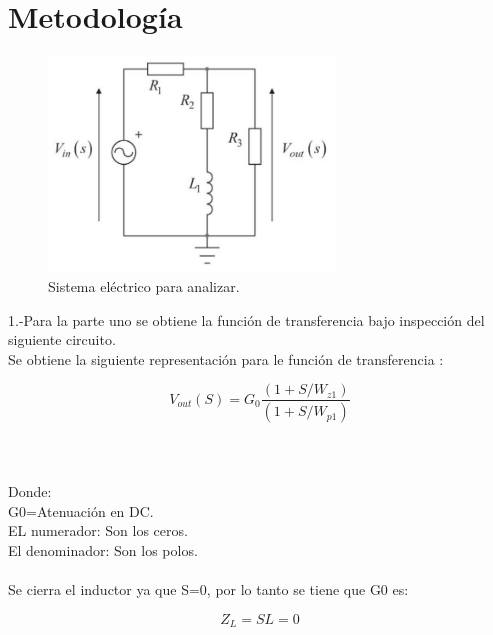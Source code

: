 \documentclass[12pt,letterpaper]{article}     %
\begin{document}
\section{Metodología}

\begin{figure}[h!]
\centering
\includegraphics[width=3in]{Circuito}
\caption{Sistema eléctrico para analizar.}

\end{figure}

1.-Para la parte uno se obtiene la función de transferencia bajo inspección del siguiente circuito.
\\
Se obtiene la siguiente representación para le función de transferencia :

\begin{equation}\label{eq:ej1}
V_{out}(S) = G_{0}\frac{(1+S/W_{z1})}{(1+S/W_{p1})} 
\end{equation}
\\\\\\
Donde:
\\
G0=Atenuación en DC.\\
EL numerador: Son los ceros.\\
El denominador: Son los polos.\\\\
Se cierra el inductor ya que S=0, por lo tanto se tiene que G0 es:

\begin{equation}\label{eq:ej2}
Z_{L} = SL = 0
\end{equation}
\end{document}
